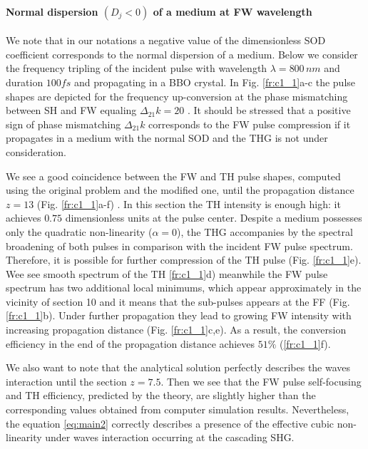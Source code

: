 \documentclass[a4paper, 12pt, onecolumn]{extarticle}
\begin{document}
\paragraph*{Normal dispersion $(D_j<0)$ of a medium at FW wavelength }
\label{par:nor}
We note that in our notations a negative value of the dimensionless SOD coefficient corresponds to the normal dispersion of a medium. Below we consider the frequency tripling of the incident pulse with wavelength \(\lambda=800\,nm\) and  duration  \(100fs\) and propagating in a BBO crystal. In Fig. \ref{fr:c1_1}a-c the pulse shapes are depicted for the frequency up-conversion at the phase mismatching between SH and FW equaling \(\Delta_{21}k=20\) . It should be stressed that a positive sign of phase mismatching \(\Delta_{21}k\) corresponds to the FW pulse compression if it propagates in a medium with the normal SOD and the THG is not under consideration.

We see a good coincidence between the FW and TH pulse shapes, computed  using the original problem and the modified one, until the propagation distance \(z=13\) (Fig. \ref{fr:c1_1}a-f) . In this section the TH intensity is enough high: it achieves \(0.75\) dimensionless units at the pulse center. Despite a medium possesses only the quadratic non-linearity (\(\alpha=0\)),  the THG  accompanies by the spectral broadening of  both pulses in comparison with the incident FW pulse spectrum. Therefore, it is possible for further compression of the TH pulse (Fig. \ref{fr:c1_1}e). Wee see smooth spectrum of the TH \ref{fr:c1_1}d) meanwhile the FW pulse spectrum has two additional local minimums, which appear approximately in the vicinity of section 10 and it means that the sub-pulses appears at the FF (Fig. \ref{fr:c1_1}b). Under further propagation they lead to growing FW intensity with increasing  propagation distance (Fig. \ref{fr:c1_1}c,e). As a result, the conversion efficiency in the end of the propagation distance achieves \(51\%\) (\ref{fr:c1_1}f).

 We also want to note that the analytical solution perfectly describes the waves interaction until the section \(z=7.5\). Then we see that the FW pulse self-focusing and TH efficiency, predicted by the theory, are slightly higher than the corresponding values obtained from computer simulation results. Nevertheless, the equation \eqref{eq:main2} correctly describes a presence of the effective cubic non-linearity under waves interaction occurring at the cascading SHG. 
 
\end{document}
